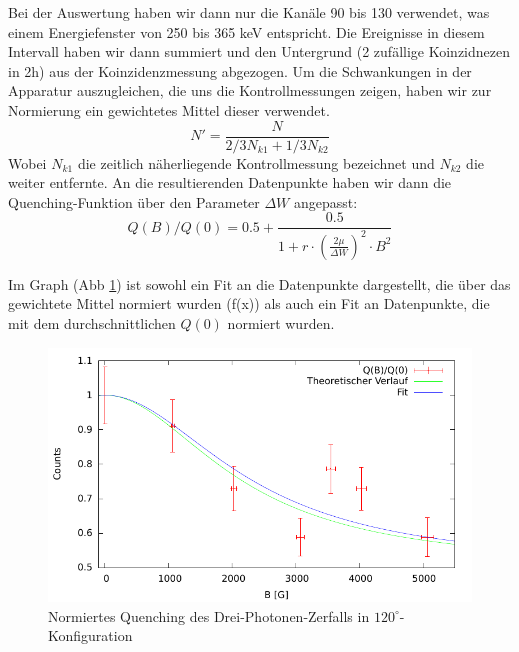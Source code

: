 
Bei der Auswertung haben wir dann nur die Kanäle 90 bis 130 verwendet, was einem Energiefenster von 250 bis 365 keV entspricht. Die Ereignisse in diesem Intervall haben wir dann summiert und den Untergrund (2 zufällige Koinzidnezen in 2h) aus der Koinzidenzmessung abgezogen. Um die Schwankungen in der Apparatur auszugleichen, die uns die Kontrollmessungen zeigen, haben wir zur Normierung ein gewichtetes Mittel dieser verwendet.
\begin{equation*}
 N' = \frac{N}{2/3 N_{k1} + 1/3 N_{k2}}
\end{equation*}
Wobei $N_{k1}$ die zeitlich näherliegende Kontrollmessung bezeichnet und $N_{k2}$ die weiter entfernte. An die resultierenden Datenpunkte haben wir dann die Quenching-Funktion über den Parameter $\Delta W$ angepasst:
\begin{equation*}
 Q(B)/Q(0) = 0.5 + \frac{0.5}{1 + r \cdot ( \frac{2  \mu }{ \Delta W})^2 \cdot B^2} 
\end{equation*}

Im Graph (Abb \ref{auswertung-quench-normiert}) ist sowohl ein Fit an die Datenpunkte dargestellt, die über das gewichtete Mittel normiert wurden (f(x)) als auch ein Fit an Datenpunkte, die mit dem durchschnittlichen $Q(0)$ normiert wurden. 



\begin{figure}
 \includegraphics[width=\textwidth]{Auswertung/quench-normiert.pdf}
 \caption{Normiertes Quenching des Drei-Photonen-Zerfalls in $120^\circ$-Konfiguration}
 \label{auswertung-quench-normiert}
\end{figure}

